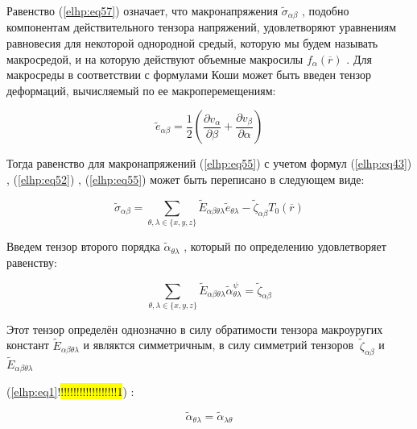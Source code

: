 Равенство 
(\ref{elhp:eq57})
означает, что макронапряжения 
$ \widetilde{\sigma}_{ \alpha\beta}$
, подобно компонентам действительного
тензора напряжений, удовлетворяют уравнениям равновесия для некоторой однородной
средый, которую мы будем называть макросредой, и на которую действуют объемные
макросилы 
$f_{\alpha} \left( \overline{r}  \right) $
. Для макросреды в соответствии с формулами Коши может быть введен
тензор деформаций, вычисляемый по ее макроперемещениям:

\begin{equation}
    \label{elhp:eq58}
    \widetilde{e}_{ \alpha\beta} =
    \frac{1}{2} 
    \left( 
        \frac{ \partial v_{\alpha}}{ \partial \beta} +
        \frac{ \partial v_{\beta}}{ \partial \alpha}
    \right) 
\end{equation}

Тогда равенство для макронапряжений 
(\ref{elhp:eq55})
с учетом формул 
(\ref{elhp:eq43})
, 
(\ref{elhp:eq52})
, 
(\ref{elhp:eq55})
может быть
переписано в следующем виде:

\begin{equation}
    \label{elhp:eq59}
    \widetilde{\sigma}_{ \alpha\beta} =
    \sum_{ \theta,\lambda \in \{x,y,z\} }
    \widetilde{E}_{ \alpha\beta \theta\lambda} 
    \widetilde{e}_{ \theta\lambda} -
    \widetilde{\zeta}_{ \alpha\beta} 
    T_0 \left( \overline{r}  \right) 
\end{equation}

Введем тензор второго порядка
$ \widetilde{\alpha}_{\theta\lambda}$
, который по определению удовлетворяет равенству:

\begin{equation}
    \label{elhp:eq60}
    \sum_{ \theta,\lambda \in \{x,y,z\} }
    \widetilde{E}_{ \alpha\beta \theta\lambda}
    \widetilde{\alpha}_{ \theta\lambda}^{\psi} =
    \widetilde{\zeta}_{ \alpha\beta}
\end{equation}

Этот тензор определён однозначно в силу обратимости тензора макроуругих констант 
$ \widetilde{E}_{ \alpha\beta \theta\lambda}$
и являктся симметричным, в силу симметрий тензоров 
$\ \widetilde{\zeta}_{ \alpha\beta}$
и
$ \widetilde{E}_{ \alpha\beta \theta\lambda}$

(\ref{elhp:eq1}!\colorbox{yellow}{!!!!!!!!!!!!!!!!!!1})
:

\begin{equation}
    \label{elhp:eq61}
    \widetilde{\alpha}_{ \theta\lambda} =
    \widetilde{\alpha}_{ \lambda\theta}
\end{equation}


